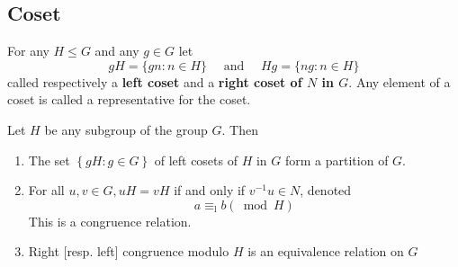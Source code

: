 \subsection{Coset} %

\begin{definition}
    For any $H \leq G$ and any $g \in G$ let
    \begin{equation*}
        g H
        =
        \{g n : n \in H\}
        \quad \text { and } \quad
        H g
        =
        \{n g : n \in H\}
    \end{equation*}
    called respectively a \textbf{left coset} and a \textbf{right coset of $N$ in $G$}. Any element of a coset is called a representative for the coset.
\end{definition}
\begin{theorem}
    Let $H$ be any subgroup of the group $G$. Then
    \begin{enumerate}
        \item
              The set $\left\{g H :g \in G\right\}$ of left cosets of $H$ in $G$ form a partition of $G$.

        \item
              For all $u, v \in G, u H=v H$ if and only if $v^{-1} u \in N$, denoted
              \begin{equation*}
                  a \equiv_{\text{l}} b \left(\bmod H\right)
              \end{equation*}
              This is a congruence relation.

        \item
              Right [resp. left] congruence modulo $H$ is an equivalence relation on $G$
    \end{enumerate}
\end{theorem}


